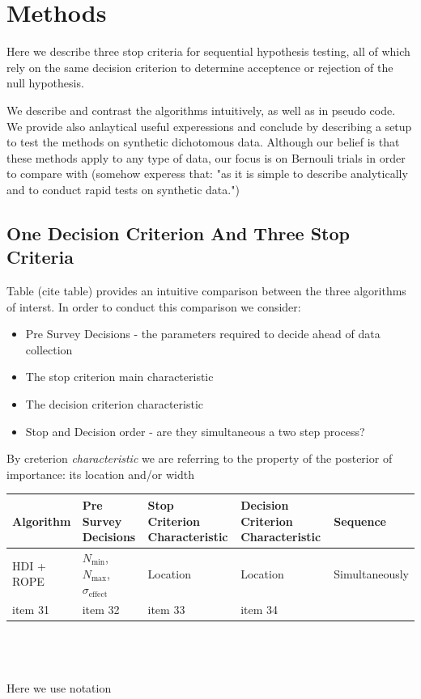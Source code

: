\documentclass{article}
\begin{document}
\section{Methods}

Here we describe three stop criteria for sequential hypothesis testing,
all of which rely on the same decision criterion to determine acceptence
or rejection of the null hypothesis.

We describe and contrast the algorithms intuitively, as well as in pseudo code.
We provide also anlaytical useful experessions and conclude by describing a setup
to test the methods on synthetic dichotomous data.
Although our belief is that these methods apply to any type of data,
our focus is on Bernouli trials in order to compare with \cite{kruschke2015doing}
(somehow experess that: "as it is simple to describe analytically and
to conduct rapid tests on synthetic data.")

\subsection{One Decision Criterion And Three Stop Criteria}

Table (cite table) provides an intuitive comparison between the three algorithms of interst.
In order to conduct this comparison we consider:
\begin{itemize}
    \item Pre Survey Decisions - the parameters required to decide ahead of data
    collection
    \item The stop criterion main characteristic 
    \item The decision criterion characteristic
    \item Stop and Decision order - are they simultaneous a two step process?
\end{itemize}
By creterion {\it characteristic} we are referring to the property of the posterior of
importance: its location and/or width


\begin{tabularx}{1.2\textwidth} { 
    | >{\raggedright\arraybackslash}X 
    | >{\centering\arraybackslash}X 
    | >{\raggedright\arraybackslash}X 
    | >{\centering\arraybackslash}X 
    | >{\raggedleft\arraybackslash}X | }
   \hline
   Algorithm & Pre Survey Decisions & Stop Criterion Characteristic

   & Decision Criterion Characteristic & Sequence\\
   \hline
   HDI + ROPE  & \textbf{$N_\mathrm{min}$}, $N_\mathrm{max}$, $\sigma_\mathrm{effect}$  & Location  & Location & Simultaneously \\
   \hline
   item 31  & item 32  & item 33  & item 34 \\
   
  \hline
  \end{tabularx}
\\
\\
\\
Here we use notation
\end{document}
